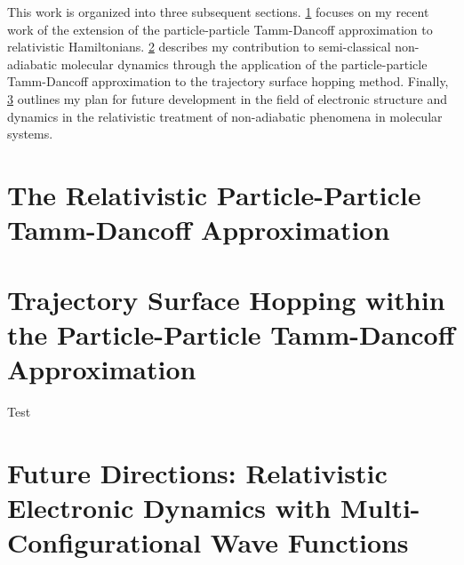\documentclass[12pt]{article}
\begin{document}
This work is organized into three subsequent sections.
\cref{sec:pp-X2C} focuses on my recent work of the extension of the
particle-particle Tamm-Dancoff approximation to relativistic Hamiltonians.
\cref{sec:pp-TSH} describes my contribution to semi-classical non-adiabatic
molecular dynamics through the application of the particle-particle Tamm-Dancoff
approximation to the trajectory surface hopping method.  Finally,
\cref{sec:Future} outlines my plan for future development in the field of
electronic structure and dynamics in the relativistic treatment of non-adiabatic
phenomena in molecular systems.


\section{The Relativistic Particle-Particle Tamm-Dancoff Approximation}
\label{sec:pp-X2C}


\section{Trajectory Surface Hopping within the Particle-Particle Tamm-Dancoff Approximation}
\label{sec:pp-TSH}
Test\cite{DBWY16_JCTC935,DBWY16_Accepted1,DBWY16_Submitted1,DBWY16_Submitted2}

\section{Future Directions: Relativistic Electronic Dynamics with Multi-Configurational Wave Functions}
\label{sec:Future}


\end{document}

